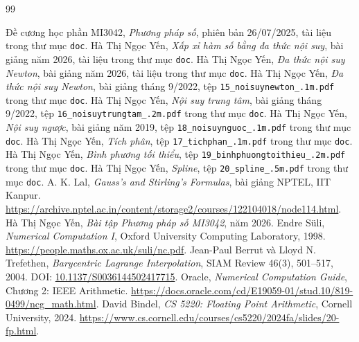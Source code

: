 \documentclass[12pt,a4paper,oneside]{book}
\numberwithin{algorithm}{chapter}
\theoremstyle{definition}
\begin{document}
\backmatter
\begin{thebibliography}{99}
\raggedright
{} Đề cương học phần MI3042, \textit{Phương pháp số}, phiên bản 26/07/2025, tài liệu trong thư mục \texttt{doc}.
 Hà Thị Ngọc Yến, \textit{Xấp xỉ hàm số bằng đa thức nội suy}, bài giảng năm 2026, tài liệu trong thư mục \texttt{doc}.
 Hà Thị Ngọc Yến, \textit{Đa thức nội suy Newton}, bài giảng năm 2026, tài liệu trong thư mục \texttt{doc}.
 Hà Thị Ngọc Yến, \textit{Đa thức nội suy Newton}, bài giảng tháng 9/2022, tệp \texttt{15\_noisuynewton\_.1m.pdf} trong thư mục \texttt{doc}.
 Hà Thị Ngọc Yến, \textit{Nội suy trung tâm}, bài giảng tháng 9/2022, tệp \texttt{16\_noisuytrungtam\_.2m.pdf} trong thư mục \texttt{doc}.
 Hà Thị Ngọc Yến, \textit{Nội suy ngược}, bài giảng năm 2019, tệp \texttt{18\_noisuynguoc\_.1m.pdf} trong thư mục \texttt{doc}.
 Hà Thị Ngọc Yến, \textit{Tích phân}, tệp \texttt{17\_tichphan\_.1m.pdf} trong thư mục \texttt{doc}.
 Hà Thị Ngọc Yến, \textit{Bình phương tối thiểu}, tệp \texttt{19\_binhphuongtoithieu\_.2m.pdf} trong thư mục \texttt{doc}.
 Hà Thị Ngọc Yến, \textit{Spline}, tệp \texttt{20\_spline\_.5m.pdf} trong thư mục \texttt{doc}.
 A. K. Lal, \textit{Gauss's and Stirling's Formulas}, bài giảng NPTEL, IIT Kanpur. \url{https://archive.nptel.ac.in/content/storage2/courses/122104018/node114.html}.
 Hà Thị Ngọc Yến, \textit{Bài tập Phương pháp số MI3042}, năm 2026.
 Endre Süli, \textit{Numerical Computation I}, Oxford University Computing Laboratory, 1998. \url{https://people.maths.ox.ac.uk/suli/nc.pdf}.
 Jean-Paul Berrut và Lloyd N. Trefethen, \textit{Barycentric Lagrange Interpolation}, SIAM Review 46(3), 501--517, 2004. DOI: \href{https://doi.org/10.1137/S0036144502417715}{10.1137/S0036144502417715}.
 Oracle, \textit{Numerical Computation Guide}, Chương 2: IEEE Arithmetic. \url{https://docs.oracle.com/cd/E19059-01/stud.10/819-0499/ncg_math.html}.
 David Bindel, \textit{CS 5220: Floating Point Arithmetic}, Cornell University, 2024. \url{https://www.cs.cornell.edu/courses/cs5220/2024fa/slides/20-fp.html}.
\end{thebibliography}
\end{document}
